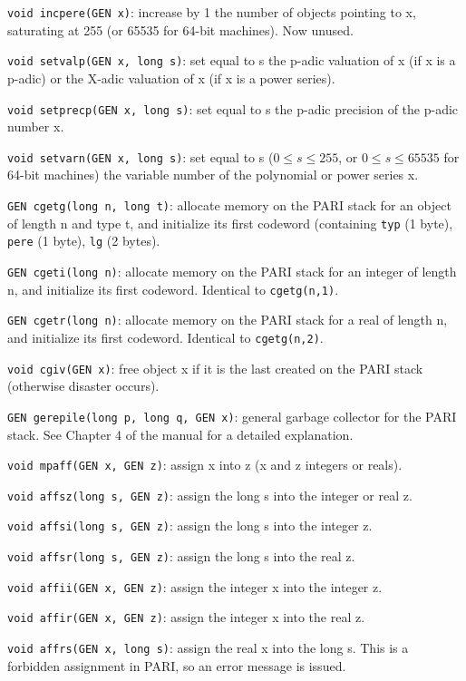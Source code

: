 {\tt void incpere(GEN x)}: increase by 1 the number of objects pointing to x,
saturating at 255 (or 65535 for 64-bit machines). Now unused.

{\tt void setvalp(GEN x, long s)}: set equal to s the p-adic valuation of x
(if x is a p-adic) or the X-adic valuation of x (if x is a power series).

{\tt void setprecp(GEN x, long s)}: set equal to s the p-adic precision of the
p-adic number x.

{\tt void setvarn(GEN x, long s)}: set equal to s ($0\le s\le255$, or
$0\le s\le65535$ for 64-bit machines) the variable
number of the polynomial or power series x.


{\tt GEN cgetg(long n, long t)}: allocate memory on the PARI stack for an
object of length n and type t, and initialize its first codeword (containing
{\tt typ} (1 byte), {\tt pere} (1 byte), {\tt lg} (2 bytes).

{\tt GEN cgeti(long n)}: allocate memory on the PARI stack for an integer
of length n, and initialize its first codeword. Identical to {\tt cgetg(n,1)}.

{\tt GEN cgetr(long n)}: allocate memory on the PARI stack for a real
of length n, and initialize its first codeword. Identical to {\tt cgetg(n,2)}.

{\tt void cgiv(GEN x)}: free object x if it is the last created on the PARI
stack (otherwise disaster occurs).

{\tt GEN gerepile(long p, long q, GEN x)}: general garbage collector for the
PARI stack. See Chapter 4 of the manual for a detailed explanation.


{\tt void mpaff(GEN x, GEN z)}: assign x into z (x and z integers or reals).

{\tt void affsz(long s, GEN z)}: assign the long s into the integer or real z.

{\tt void affsi(long s, GEN z)}: assign the long s into the integer z.

{\tt void affsr(long s, GEN z)}: assign the long s into the real z.

{\tt void affii(GEN x, GEN z)}: assign the integer x into the integer z.

{\tt void affir(GEN x, GEN z)}: assign the integer x into the real z.

{\tt void affrs(GEN x, long s)}: assign the real x into the long s. This is a
forbidden assignment in PARI, so an error message is issued.

